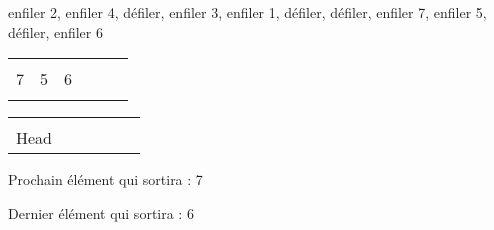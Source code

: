\documentclass[11pt,a4paper]{article}
\begin{document}
\begin{center}

\begin{large}
enfiler 2, enfiler 4, défiler, enfiler 3, enfiler 1, défiler, défiler, enfiler 7, enfiler 5, défiler, enfiler 6
\end{large}

\bigskip

\begin{tabular}{ | C{1cm} | C{1cm} | C{1cm} | C{1cm} | C{1cm} | C{1cm} | }
  \hline
     &    &    &  &  &  \\
   7 &  5 &  6 &  &  &  \\
     &    &    &  &  &  \\
  \hline
\end{tabular}

\smallskip

\begin{tabular}{   C{1cm}   C{1cm}   C{1cm}   C{1cm}   C{1cm}   C{1cm}   }
   &  &  &  &  &  \\
  Head &  &  &  &  &  \\
\end{tabular}






\begin{table}[ht!]
  \begin{minipage}{0.50\textwidth}

Prochain élément qui sortira : 7

  \end{minipage}
  \hfillx
  \begin{minipage}{0.50\textwidth}

Dernier élément qui sortira : 6

  \end{minipage}
\end{table}
\end{center}
\end{document}
